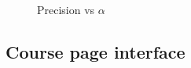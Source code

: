 \begin{figure}[ht]
	\centering
 	\caption{Precision vs $\alpha$} 
 	\label{Results}
\end{figure} 

\newpage

\subsection{Course page interface}

